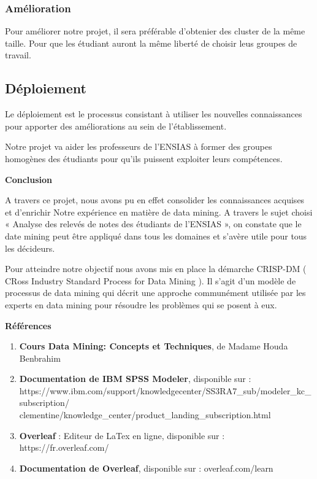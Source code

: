 \documentclass{article}
\begin{document}
            \subsubsection{Amélioration}
            Pour améliorer notre projet, il sera préférable d'obtenier des cluster de la même taille. Pour que les étudiant auront la même liberté de choisir leus groupes de travail.
            \subsection{Déploiement}
            Le déploiement est le processus consistant  à utiliser les nouvelles connaissances pour apporter des améliorations au sein de l'établissement. 
            \par Notre projet va aider les professeurs de l'ENSIAS à former des groupes homogènes des étudiants pour qu'ils puissent exploiter leurs compétences.
            
    \newpage
    \begin{center}
    \Large \textbf{Conclusion}
    \end{center}
    \begin{spacing}{2}
    \par A travers ce projet, nous avons pu en effet consolider les connaissances acquises et d’enrichir Notre expérience en matière de data mining. A travers le sujet choisi « Analyse des relevés de notes des étudiants de l’ENSIAS », on constate que le date mining peut être appliqué dans tous les domaines et s’avère utile pour tous les décideurs.
    \par Pour atteindre notre objectif nous avons mis en place la démarche CRISP-DM ( CRoss Industry Standard Process for Data Mining ). Il s’agit d’un modèle de processus de data mining qui décrit une approche communément utilisée par les experts en data mining pour résoudre les problèmes qui se posent à eux.
    \end{spacing}
    \newpage
    \begin{center}
    \Large \textbf{Références}
    \end{center}
    \begin{spacing}{2}
    \begin{enumerate}
        \item \large{\textbf{Cours Data Mining: Concepts et Techniques}}, de Madame Houda \newline Benbrahim
        \item \large{\textbf{Documentation de IBM SPSS Modeler}}, disponible sur : https://www.ibm.com/\newline support/knowledgecenter/SS3RA7\_sub/modeler\_kc\_subscription/ clementine/\newline knowledge\_center/product\_landing\_subscription.html
        \item \large{\textbf{Overleaf}} : Editeur de LaTex en ligne, disponible sur : https://fr.overleaf.com/
        \item \large{\textbf{Documentation de Overleaf}}, disponible sur :  overleaf.com/learn
    \end{enumerate}
    \end{spacing}
\end{document}
